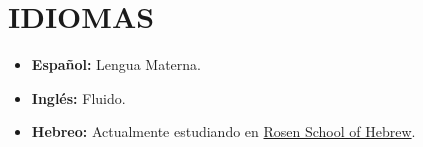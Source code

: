 \documentclass[paper=letter,fontsize=11pt]{scrartcl} %
\newcommand{\sepspace}{\vspace*{1em}}		%
\newcommand{\NewPart}[2]{\section*{\uppercase{#1} \small \normalfont #2}}
\newcommand{\WorkEntry}[5]{
		\noindent \textbf{#1}
        \noindent \small \textit{#2}
        \hfill      %
        \colorbox{White}{%
			\parbox{6em}{%
			\hfill\color{Black}#3}} \par  %
		\noindent \textit{#4} \par        %
		\noindent\hangindent=2em\hangafter=0 \small #5 %
		\normalsize \par}
\newcommand{\Text}[1]{\par       
		\noindent \small #1 
		\normalsize \par}
\begin{document}
\sepspace

\NewPart{IDIOMAS}{}

\begin{itemize}
\item \textbf{Español:} Lengua Materna.
\item \textbf{Inglés:} Fluido.
\item \textbf{Hebreo:} Actualmente estudiando en {\href{https://rosenhebrewschool.com/}{Rosen School of Hebrew}}.
\end{itemize}

\end{document}
